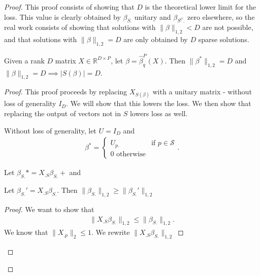  \begin{proof}

This proof consists of showing that $D$ is the theoretical lower limit for the loss.
This value is clearly obtained by $\beta_{S.}$ unitary and $\beta_{S^C.}$ zero elsewhere, so the real work consists of showing that solutions with $\|\beta\|_{1,2} < D$ are not possible, and that solutions with $\|\beta\|_{1,2}  = D$ are only obtained by $D$ sparse solutions.

\begin{proposition}
Given a rank $D$ matrix $X \in \mathbb{R}^{D \times P}$, let $\beta = \widehat \beta^P_q(X)$.
Then $\|\beta^*\|_{1,2} = D$ and $\|\beta\|_{1,2} = D \implies |S(\beta)| = D$.

\end{proposition}

\begin{proof}

This proof proceeds by replacing $X_{S(\beta)}$ with a unitary matrix - without loss of generality $I_D$.
We will show that this lowers the loss.
We then show that replacing the output of vectors not in $S$ lowers loss as well.

Without loss of generality, let $U = I_D$ and 
\begin{align}
\beta^* = \begin{cases}
U_{p.} & \text{if } p \in \mathcal{S} \\
0 \text{ otherwise}
\end{cases}.
\end{align}


Let $\beta_{S.}* = X_{.S} \beta_{S.} + $ and 

\begin{proposition}
\label{prop:support_orthogonalization}
Let $\beta_{S.}' = X_{.S} \beta_{S.}$.
Then $\|\beta_{S.}\|_{1,2} \geq \|\beta_{S.}'\|_{1,2}$
\end{proposition}
\begin{proof}
We want to show that 
\begin{align}
\| X_{.S} \beta_{S.}  \|_{1,2} \leq \|\beta_{S.}\|_{1,2}. %
\end{align}
We know that $\| X_{.p} \|_2 \leq 1.$
We rewrite $\| X_{.S} \beta_{S.}  \|_{1,2} $


\end{proof}
\end{proof}
\end{proof}
